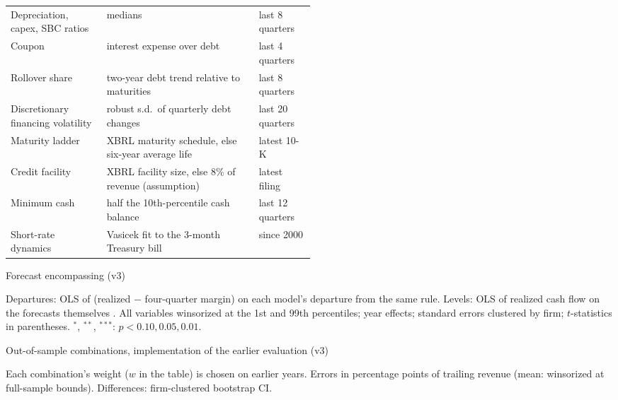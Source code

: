 \begin{table}[!htbp]
\begin{tabular}{lp{0.5\linewidth}l}
Depreciation, capex, SBC ratios & medians & last 8 quarters \\
Coupon & interest expense over debt & last 4 quarters \\
Rollover share & two-year debt trend relative to maturities & last 8 quarters \\
Discretionary financing volatility & robust s.d.\ of quarterly debt changes & last 20 quarters \\
Maturity ladder & XBRL maturity schedule, else six-year average life & latest 10-K \\
Credit facility & XBRL facility size, else 8\% of revenue (assumption) & latest filing \\
Minimum cash & half the 10th-percentile cash balance & last 12 quarters \\
Short-rate dynamics & Vasicek fit to the 3-month Treasury bill & since 2000 \\
\bottomrule
\end{tabular}
\end{table}

\begin{table}[!htbp]
\centering\scriptsize
\caption{Forecast encompassing (v3)}
\label{tab:encompassing}

\par\smallskip
\begin{minipage}{\linewidth}\footnotesize
Departures: OLS of (realized $-$ four-quarter margin) on each model's departure from the same rule. Levels: OLS of realized cash flow on the forecasts themselves \citep{fair1990}. All variables winsorized at the 1st and 99th percentiles; year effects; standard errors clustered by firm; $t$-statistics in parentheses. $^{*}$, $^{**}$, $^{***}$: $p<0.10, 0.05, 0.01$.
\end{minipage}
\end{table}

\begin{table}[!htbp]
\centering\footnotesize
\caption{Out-of-sample combinations, implementation of the earlier evaluation (v3)}
\label{tab:hybrid}

\par\smallskip
\begin{minipage}{\linewidth}\footnotesize
Each combination's weight ($w$ in the table) is chosen on earlier years. Errors in percentage points of trailing revenue (mean: winsorized at full-sample bounds). Differences: firm-clustered bootstrap CI.
\end{minipage}
\end{table}

